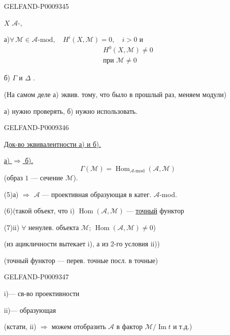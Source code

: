\begin{GelfandAdjacentEvidence}{GELFAND-P000934}{5}


 $X$  $\mathcal A$-, 

а)\enspace $\forall\,\mathcal M\in\mathcal A\text{-mod},\quad H^i(X,\mathcal M)=0,\quad i>0$ и
\[
 \begin{gathered}
 H^0(X,\mathcal M)\ne0\\[-2pt]
 \text{при }\mathcal M\ne0
 \end{gathered}
\]

б)\enspace {} $\Gamma$ и $\Delta$ .

(На самом деле а) эквив. тому, что было в прошлый раз, меняем модули)

а) нужно проверять, б) нужно использовать.
\end{GelfandAdjacentEvidence}
\begin{GelfandAdjacentEvidence}{GELFAND-P000934}{6}


\underline{Док-во эквивалентности а) и б).}

\underline{а) $\Rightarrow$ б).}
\begin{equation*}
 \Gamma(\mathcal M)=\operatorname{Hom}_{\mathcal A\text{-mod}}(\mathcal A,\mathcal M)
 \tag{4}
\end{equation*}
(образ $1$ --- сечение $\mathcal M$).

(5)\quad а) $\Rightarrow$ $\mathcal A$ --- проективная образующая в катег. $\mathcal A$-mod.

(6)\quad (такой объект, что i) $\operatorname{Hom}(\mathcal A,\mathcal M)$ --- \underline{точный} функтор

(7)\quad ii) $\forall$ ненулев. объекта $\mathcal M$;\enspace
$\operatorname{Hom}(\mathcal A,\mathcal M)\ne0$)

(из ацикличности вытекает i), а из 2-го условия ii))

(точный функтор --- перев. точные посл. в точные)
\end{GelfandAdjacentEvidence}
\begin{GelfandAdjacentEvidence}{GELFAND-P000934}{7}


i)\enspace --- св-во проективности

ii)\enspace --- образующая

(кстати, ii) $\Rightarrow$ можем отобразить $\mathcal A$ в фактор $\mathcal M/\operatorname{Im}t$ и т.д.)
\end{GelfandAdjacentEvidence}
